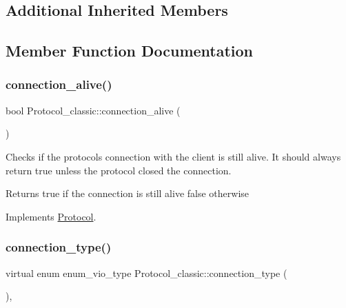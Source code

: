 \subsection*{Additional Inherited Members}


\subsection{Member Function Documentation}
\mbox{\label{classProtocol__classic_a76a10534621100f5f07105bc26fd6ada}} 
\subsubsection{\texorpdfstring{connection\+\_\+alive()}{connection\_alive()}}
{\footnotesize\ttfamily bool Protocol\+\_\+classic\+::connection\+\_\+alive (\begin{DoxyParamCaption}{ }\end{DoxyParamCaption})\hspace{0.3cm}{\ttfamily [virtual]}}

Checks if the protocol\textquotesingle{}s connection with the client is still alive. It should always return true unless the protocol closed the connection.

\begin{DoxyReturn}{Returns}
true if the connection is still alive false otherwise 
\end{DoxyReturn}


Implements \mbox{\hyperlink{classProtocol_af4ed0f36d7e3458766d522432bf4f2d5}{Protocol}}.

\mbox{\label{classProtocol__classic_a7bcc8842c0d81b340310e10a0ec77f4b}} 
\subsubsection{\texorpdfstring{connection\+\_\+type()}{connection\_type()}}
{\footnotesize\ttfamily virtual enum enum\+\_\+vio\+\_\+type Protocol\+\_\+classic\+::connection\+\_\+type (\begin{DoxyParamCaption}{ }\end{DoxyParamCaption})\hspace{0.3cm}{\ttfamily [inline]}, {\ttfamily [virtual]}}

